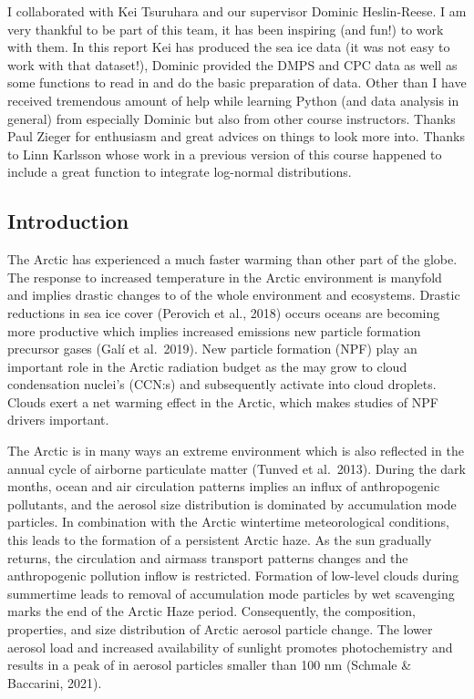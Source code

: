 \documentclass[11pt]{article}
\begin{document}
I collaborated with Kei Tsuruhara and our supervisor Dominic
Heslin-Reese. I am very thankful to be part of this team, it has been
inspiring (and fun!) to work with them. In this report Kei has produced
the sea ice data (it was not easy to work with that dataset!), Dominic
provided the DMPS and CPC data as well as some functions to read in and
do the basic preparation of data. Other than I have received tremendous
amount of help while learning Python (and data analysis in general) from
especially Dominic but also from other course instructors. Thanks Paul
Zieger for enthusiasm and great advices on things to look more into.
Thanks to Linn Karlsson whose work in a previous version of this course
happened to include a great function to integrate log-normal
distributions.

    \hypertarget{introduction}{%
\subsection{Introduction}\label{introduction}}

The Arctic has experienced a much faster warming than other part of the
globe. The response to increased temperature in the Arctic environment
is manyfold and implies drastic changes to of the whole environment and
ecosystems. Drastic reductions in sea ice cover (Perovich et al., 2018)
occurs oceans are becoming more productive which implies increased
emissions new particle formation precursor gases (Galí et al.~2019). New
particle formation (NPF) play an important role in the Arctic radiation
budget as the may grow to cloud condensation nuclei's (CCN:s) and
subsequently activate into cloud droplets. Clouds exert a net warming
effect in the Arctic, which makes studies of NPF drivers important.

The Arctic is in many ways an extreme environment which is also
reflected in the annual cycle of airborne particulate matter (Tunved et
al.~2013). During the dark months, ocean and air circulation patterns
implies an influx of anthropogenic pollutants, and the aerosol size
distribution is dominated by accumulation mode particles. In combination
with the Arctic wintertime meteorological conditions, this leads to the
formation of a persistent Arctic haze. As the sun gradually returns, the
circulation and airmass transport patterns changes and the anthropogenic
pollution inflow is restricted. Formation of low-level clouds during
summertime leads to removal of accumulation mode particles by wet
scavenging marks the end of the Arctic Haze period. Consequently, the
composition, properties, and size distribution of Arctic aerosol
particle change. The lower aerosol load and increased availability of
sunlight promotes photochemistry and results in a peak of in aerosol
particles smaller than 100 nm (Schmale \& Baccarini, 2021).
\end{document}
